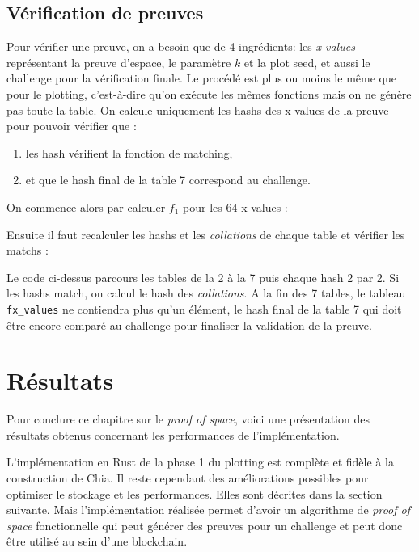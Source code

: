 \subsection{Vérification de preuves}

Pour vérifier une preuve, on a besoin que de 4 ingrédients: les \emph{x-values} représentant la preuve d'espace, le paramètre $k$ et la plot seed, et aussi le challenge pour la vérification finale. Le procédé est plus ou moins le même que pour le plotting, c'est-à-dire qu'on exécute les mêmes fonctions mais on ne génère pas toute la table. On calcule uniquement les hashs des x-values de la preuve pour pouvoir vérifier que :

\begin{enumerate}
  \item les hash vérifient la fonction de matching,
  \item et que le hash final de la table 7 correspond au challenge.
\end{enumerate}

On commence alors par calculer $f_1$ pour les 64 x-values :


\newpage

Ensuite il faut recalculer les hashs et les \emph{collations} de chaque table et vérifier les matchs :


Le code ci-dessus parcours les tables de la 2 à la 7 puis chaque hash 2 par 2. Si les hashs match, on calcul le hash des \emph{collations}. A la fin des 7 tables, le tableau \verb|fx_values| ne contiendra plus qu'un élément, le hash final de la table 7 qui doit être encore comparé au challenge pour finaliser la validation de la preuve. 

\section{Résultats}

Pour conclure ce chapitre sur le \emph{proof of space}, voici une présentation des résultats obtenus concernant les performances de l'implémentation.

L'implémentation en Rust de la phase 1 du plotting est complète et fidèle à la construction \cite{chia:construction} de Chia. Il reste cependant des améliorations possibles pour optimiser le stockage et les performances. Elles sont décrites dans la section suivante. Mais l'implémentation réalisée permet d'avoir un algorithme de \emph{proof of space} fonctionnelle qui peut générer des preuves pour un challenge et peut donc être utilisé au sein d'une blockchain.


